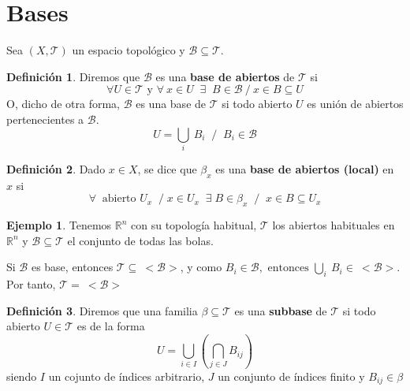 \documentclass[12pt,twoside]{report}
\newcommand\mc[1]{\mathcal{#1}}
\theoremstyle{azul}
\theoremstyle{azul2}
\theoremstyle{plain}
\theoremstyle{definition}
\newtheorem*{eje}{Ejemplo}
\newtheorem*{defi}{Definición}
\theoremstyle{remark}
\begin{document}
\section{Bases} \label{sec:bases}
Sea $(X,\mc{T})$ un espacio topológico y $\mathcal{B} \subseteq \mc{T}$.
\begin{defi}
Diremos que $\mathcal{B}$ es una \textbf{base de abiertos} de $\mc{T}$ si
$$\forall U\in \mc{T} \text{ y } \forall \: x \in U \;\; \exists \;\; B \in \mathcal{B} \: / \: x \in B \subseteq U$$
O, dicho de otra forma, $\mathcal{B}$ es una base de $\mc{T}$ si todo abierto $U$ es unión de abiertos pertenecientes a $\mathcal{B}$.
$$U=\underset{i}{\bigcup} \: B_i \;\; / \;\; B_i \in \mathcal{B}$$
\end{defi}
\begin{defi}
Dado $x\in X$, se dice que $\beta_x$ es una \textbf{base de abiertos (local)} en $x$ si$$\forall \;\; \text{abierto } U_x \;\; / \; x \in U_x \;\; \exists \; B \in \beta_x \;\; / \;\; x \in B \subseteq U_x$$
\end{defi}
\begin{eje}
Tenemos $\mathbb{R}^n$ con su topología habitual, $\mc{T}$ los abiertos habituales en $\mathbb{R}^n$ y $\mathcal{B} \subseteq \mc{T}$ el conjunto de todas las bolas.

Si $\mathcal{B}$ es base, entonces $\mc{T} \subseteq \: < \mathcal{B}>$, y como $B_i \in \mathcal{B}, \text{ entonces } \underset{i}{\bigcup} \: B_i \in \: <\mathcal{B}>$. Por tanto, $\mc{T}= \: < \mathcal{B}>$ 
\end{eje}

\begin{defi}
Diremos que una familia $\beta\subseteq\mc{T}$ es una \textbf{subbase} de $\mc{T}$ si  todo abierto $U\in \mc{T}$ es de la forma
$$U=\underset{i\in I}{\bigcup}\left(\underset{j\in J}{\bigcap}B_{ij}\right)$$
siendo $I$ un cojunto de índices arbitrario, $J$ un conjunto de índices finito y $B_{ij}\in\beta$ 
\end{defi}
\end{document}
